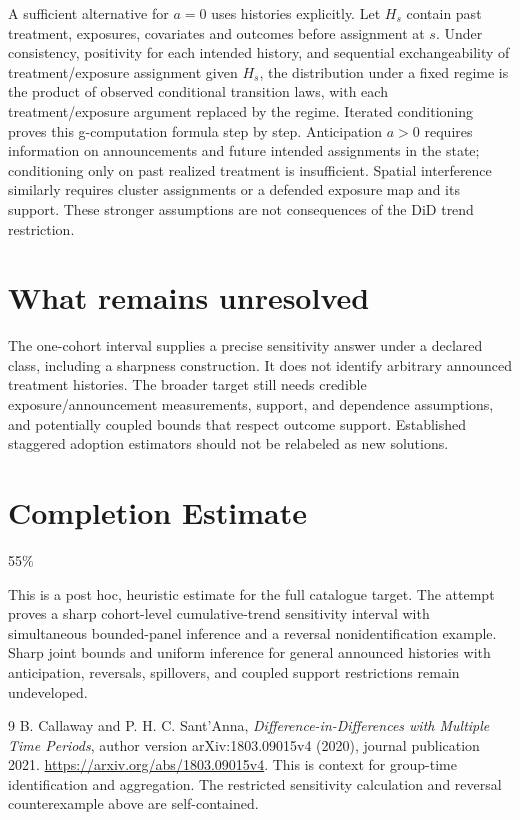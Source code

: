 \documentclass[11pt]{article}
\theoremstyle{definition}
\begin{document}
A sufficient alternative for $a=0$ uses histories explicitly. Let $H_s$ contain
past treatment, exposures, covariates and outcomes before assignment at $s$.
Under consistency, positivity for each intended history, and sequential
exchangeability of treatment/exposure assignment given $H_s$, the distribution
under a fixed regime is the product of observed conditional transition laws,
with each treatment/exposure argument replaced by the regime. Iterated
conditioning proves this g-computation formula step by step. Anticipation
$a>0$ requires information on announcements and future intended assignments in
the state; conditioning only on past realized treatment is insufficient.
Spatial interference similarly requires cluster assignments or a defended
exposure map and its support. These stronger assumptions are not consequences
of the DiD trend restriction.

\section*{What remains unresolved}
The one-cohort interval supplies a precise sensitivity answer under a declared
class, including a sharpness construction. It does not identify arbitrary
announced treatment histories. The broader target still needs credible
exposure/announcement measurements, support, and dependence assumptions, and
potentially coupled bounds that respect outcome support. Established staggered
adoption estimators should not be relabeled as new solutions.

\section{Completion Estimate}
55\%

This is a post hoc, heuristic estimate for the full catalogue target.
The attempt proves a sharp cohort-level cumulative-trend sensitivity interval with simultaneous bounded-panel inference and a reversal nonidentification example. Sharp joint bounds and uniform inference for general announced histories with anticipation, reversals, spillovers, and coupled support restrictions remain undeveloped.

\begin{thebibliography}{9}
 B. Callaway and P. H. C. Sant'Anna,
\emph{Difference-in-Differences with Multiple Time Periods}, author version
arXiv:1803.09015v4 (2020), journal publication 2021.
\url{https://arxiv.org/abs/1803.09015v4}.
This is context for group-time identification and aggregation. The restricted
sensitivity calculation and reversal counterexample above are self-contained.
\end{thebibliography}
\end{document}
